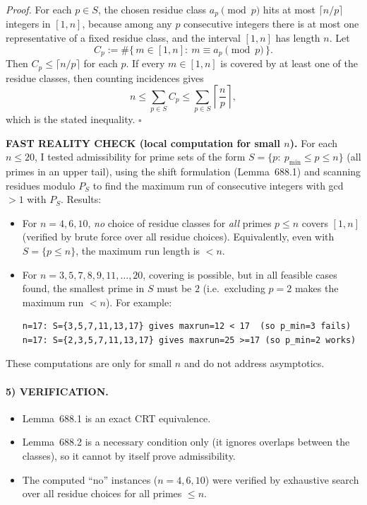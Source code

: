 \emph{Proof.}
For each $p\in S$, the chosen residue class $a_p\pmod p$ hits at most $\lceil n/p\rceil$ integers in $[1,n]$, because among any $p$ consecutive integers
there is at most one representative of a fixed residue class, and the interval $[1,n]$ has length $n$.
Let
\[
C_p:=\#\{\,m\in[1,n]:\ m\equiv a_p\pmod p\,\}.
\]
Then $C_p\le \lceil n/p\rceil$ for each $p$.
If every $m\in[1,n]$ is covered by at least one of the residue classes, then counting incidences gives
\[
n \le \sum_{p\in S} C_p \le \sum_{p\in S}\left\lceil\frac{n}{p}\right\rceil,
\]
which is the stated inequality. \hfill$\square$

\medskip
\noindent\textbf{FAST REALITY CHECK (local computation for small $n$).}
For each $n\le 20$, I tested admissibility for prime sets of the form $S=\{p:\ p_{\min}\le p\le n\}$ (all primes in an upper tail),
using the shift formulation (Lemma~688.1) and scanning residues modulo $P_S$ to find the maximum run of consecutive integers with gcd$>1$ with $P_S$.
Results:
\begin{itemize}
\item For $n=4,6,10$, \emph{no} choice of residue classes for \emph{all} primes $p\le n$ covers $[1,n]$ (verified by brute force over all residue choices).
Equivalently, even with $S=\{p\le n\}$, the maximum run length is $<n$.
\item For $n=3,5,7,8,9,11,\dots,20$, covering is possible, but in all feasible cases found, the smallest prime in $S$ must be $2$
(i.e.\ excluding $p=2$ makes the maximum run $<n$). For example:
\begin{verbatim}
n=17: S={3,5,7,11,13,17} gives maxrun=12 < 17  (so p_min=3 fails)
n=17: S={2,3,5,7,11,13,17} gives maxrun=25 >=17 (so p_min=2 works)
\end{verbatim}
\end{itemize}
These computations are only for small $n$ and do not address asymptotics.

\paragraph{5) VERIFICATION.}
\begin{itemize}
\item Lemma~688.1 is an exact CRT equivalence.
\item Lemma~688.2 is a necessary condition only (it ignores overlaps between the classes), so it cannot by itself prove admissibility.
\item The computed ``no'' instances ($n=4,6,10$) were verified by exhaustive search over all residue choices for all primes $\le n$.
\end{itemize}

